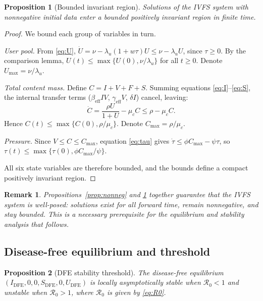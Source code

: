 \documentclass[11pt]{article}
\newtheorem{proposition}{Proposition}
\newtheorem{remark}{Remark}
\begin{document}
\begin{proposition}[Bounded invariant region]
\label{prop:bounded}
Solutions of the IVFS system with nonnegative initial data enter a bounded positively invariant region in finite time.
\end{proposition}

\begin{proof}
We bound each group of variables in turn.

\emph{User pool.} From \eqref{eq:U}, $\dot{U} = \nu - \lambda_u(1+w\tau)U \leq \nu - \lambda_u U$, since $\tau \geq 0$. By the comparison lemma, $U(t) \leq \max\{U(0), \nu/\lambda_u\}$ for all $t \geq 0$. Denote $U_{\max} = \nu/\lambda_u$.

\emph{Total content mass.} Define $C = I + V + F + S$. Summing equations \eqref{eq:I}--\eqref{eq:S}, the internal transfer terms ($\beta_{\mathrm{eff}} IV$, $\gamma_{\mathrm{eff}} V$, $\delta I$) cancel, leaving:
\[
\dot{C} = \frac{\rho U}{1+U} - \mu_c C \leq \rho - \mu_c C.
\]
Hence $C(t) \leq \max\{C(0), \rho/\mu_c\}$. Denote $C_{\max} = \rho/\mu_c$.

\emph{Pressure.} Since $V \leq C \leq C_{\max}$, equation \eqref{eq:tau} gives $\dot{\tau} \leq \phi C_{\max} - \psi\tau$, so $\tau(t) \leq \max\{\tau(0), \phi C_{\max}/\psi\}$.

All six state variables are therefore bounded, and the bounds define a compact positively invariant region.
\end{proof}

\begin{remark}
Propositions~\ref{prop:nonneg} and \ref{prop:bounded} together guarantee that the IVFS system is well-posed: solutions exist for all forward time, remain nonneg\-ative, and stay bounded. This is a necessary prerequisite for the equilibrium and stability analysis that follows.
\end{remark}

\subsection{Disease-free equilibrium and threshold}

\begin{proposition}[DFE stability threshold]
\label{prop:dfe}
The disease-free equilibrium $(I_{\mathrm{DFE}}, 0, 0, S_{\mathrm{DFE}}, 0, U_{\mathrm{DFE}})$ is locally asymptotically stable when $\mathcal{R}_0 < 1$ and unstable when $\mathcal{R}_0 > 1$, where $\mathcal{R}_0$ is given by \eqref{eq:R0}.
\end{proposition}
\end{document}
